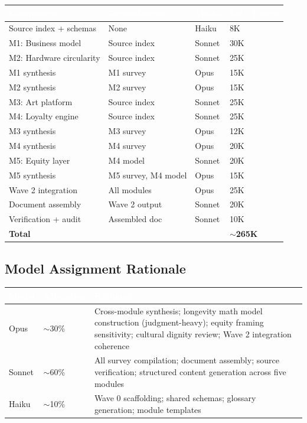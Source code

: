 \documentclass[11pt,letterpaper]{article}
\newcommand{\tableheader}[1]{\textbf{\sffamily\textcolor{white}{#1}}}
\begin{document}
\begin{center}
\begin{tabularx}{\textwidth}{L{3cm}L{3cm}C{1.5cm}C{2cm}}
\toprule
{}
\tableheader{Component} & \tableheader{Dependencies} & \tableheader{Model} & \tableheader{Est.\ Tokens} \\
\midrule
Source index + schemas & None & Haiku & 8K \\
M1: Business model & Source index & Sonnet & 30K \\
M2: Hardware circularity & Source index & Sonnet & 25K \\
M1 synthesis & M1 survey & Opus & 15K \\
M2 synthesis & M2 survey & Opus & 15K \\
M3: Art platform & Source index & Sonnet & 25K \\
M4: Loyalty engine & Source index & Sonnet & 25K \\
M3 synthesis & M3 survey & Opus & 12K \\
M4 synthesis & M4 survey & Opus & 20K \\
M5: Equity layer & M4 model & Sonnet & 20K \\
M5 synthesis & M5 survey, M4 model & Opus & 15K \\
Wave 2 integration & All modules & Opus & 25K \\
Document assembly & Wave 2 output & Sonnet & 20K \\
Verification + audit & Assembled doc & Sonnet & 10K \\
\hline
\textbf{Total} & & & \textbf{$\sim$265K} \\
\bottomrule
\end{tabularx}
\end{center}

\subsection{Model Assignment Rationale}

\begin{center}
\begin{tabularx}{\textwidth}{L{2cm}C{2cm}X}
\toprule
{}
\tableheader{Model} & \tableheader{Allocation} & \tableheader{Rationale} \\
\midrule
Opus & $\sim$30\% & Cross-module synthesis; longevity math model construction (judgment-heavy); equity framing sensitivity; cultural dignity review; Wave 2 integration coherence \\
Sonnet & $\sim$60\% & All survey compilation; document assembly; source verification; structured content generation across five modules \\
Haiku & $\sim$10\% & Wave 0 scaffolding; shared schemas; glossary generation; module templates \\
\bottomrule
\end{tabularx}
\end{center}
\end{document}
